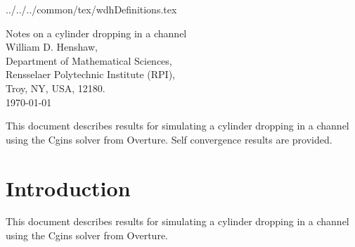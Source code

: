 \documentclass[11pt]{article}
\newcommand{\CgTexDir}{../../../common/tex}%
\begin{document}
 \CgTexDir/wdhDefinitions.tex

\newcommand{\dt}{{\Delta t}}
\newcommand{\rhos}{{\rho_b}}
\newcommand{\rhob}{{\rho_b}}

\newcommand{\Bc}{{\mathcal B}}
\newcommand{\Dc}{{\mathcal D}}
\newcommand{\Ec}{{\mathcal E}}
\newcommand{\Fc}{{\mathcal F}}
\newcommand{\Gc}{{\mathcal G}}
\newcommand{\Hc}{{\mathcal H}}
\newcommand{\Ic}{{\mathcal I}}
\newcommand{\Jc}{{\mathcal J}}
\newcommand{\Lc}{{\mathcal L}}
\newcommand{\Nc}{{\mathcal N}}
\newcommand{\Pc}{{\mathcal P}}
\newcommand{\Rc}{{\mathcal R}}
\newcommand{\Sc}{{\mathcal S}}

\newcommand{\bogus}[1]{}  %

\vspace{5\baselineskip}
\begin{flushleft}
{\LARGE
Notes on a cylinder dropping in a channel \\
}
\vspace{2\baselineskip}
William D. Henshaw, \\
% 
\smallskip
% 
Department of Mathematical Sciences, \\
Rensselaer Polytechnic Institute (RPI), \\
Troy, NY, USA, 12180. \\
\vspace{\baselineskip}
\today\\

\vspace{4\baselineskip}


This document describes results for simulating a cylinder dropping in a channel using the Cgins solver
from Overture. Self convergence results are provided. 

\end{flushleft}

\tableofcontents

\clearpage
\section{Introduction}

This document describes results for simulating a cylinder dropping in a channel using the Cgins solver
from Overture. 
\end{document}
